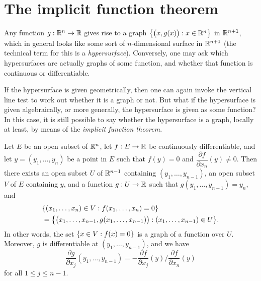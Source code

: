 \section{The implicit function theorem}\label{sec:6.8}

\begin{note}
  Any function \(g : \mathbb{R}^n \to \mathbb{R}\) gives rise to a graph \(\left\lbrace\big(x, g(x)\big) : x \in \mathbb{R}^n\right\rbrace\) in \(\mathbb{R}^{n + 1}\), which in general looks like some sort of \(n\)-dimensional surface in \(\mathbb{R}^{n + 1}\)
  (the technical term for this is a \emph{hypersurface}).
  Conversely, one may ask which hypersurfaces are actually graphs of some function, and whether that function is continuous or differentiable.
\end{note}

\begin{note}
  If the hypersurface is given geometrically, then one can again invoke the vertical line test to work out whether it is a graph or not.
  But what if the hypersurface is given algebraically, or more generally, the hypersurface is given as some function?
  In this case, it is still possible to say whether the hypersurface is a graph, locally at least, by means of the \emph{implicit function theorem}.
\end{note}

\begin{thm}\label{6.8.1}
  Let \(E\) be an open subset of \(\mathbb{R}^n\), let \(f : E \to \mathbb{R}\) be continuously differentiable, and let \(y = (y_1, \dots, y_n)\) be a point in \(E\) such that \(f(y) = 0\) and \(\dfrac{\partial f}{\partial x_n}(y) \neq 0\).
  Then there exists an open subset \(U\) of \(\mathbb{R}^{n - 1}\) containing \((y_1, \dots, y_{n - 1})\), an open subset \(V\) of \(E\) containing \(y\), and a function \(g : U \to \mathbb{R}\) such that \(g(y_1, \dots, y_{n - 1}) = y_n\), and
  \begin{align*}
     & \set{(x_1, \dots, x_n) \in V : f(x_1, \dots, x_n) = 0}                                             \\
     & = \set{\big(x_1, \dots, x_{n - 1}, g(x_1, \dots, x_{n - 1})\big) : (x_1, \dots, x_{n - 1}) \in U}.
  \end{align*}
  In other words, the set \(\left\lbrace x \in V : f(x) = 0\right\rbrace\) is a graph of a function over \(U\).
  Moreover, \(g\) is differentiable at \((y_1, \dots, y_{n - 1})\), and we have
  \[
    \dfrac{\partial g}{\partial x_j}(y_1, \dots, y_{n - 1}) = -\dfrac{\partial f}{\partial x_j}(y) / \dfrac{\partial f}{\partial x_n}(y) \tag{6.1}\label{eq 6.1}
  \]
  for all \(1 \leq j \leq n - 1\).
\end{thm}

